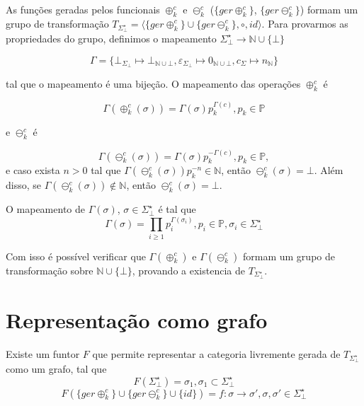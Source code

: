 \documentclass[a4paper]{article}
\newcommand{\baseset}{{\Sigma^\star_\bot}}
\newcommand{\opa}{{\oplus^c_k}}
\newcommand{\gopa}{{\{ger\opa\}}}
\newcommand{\opb}{{\ominus^c_k}}
\newcommand{\gopb}{{\{ger\opb\}}}
\newcommand{\transMon}{{T_\baseset}}
\newcommand{\composition}{{\circ}}
\newcommand{\morun}{{\gopa \cup \gopb \cup \{id\}}}
\begin{document}
As funções geradas pelos funcionais $\opa$ e $\opb$ ($\gopa$, $\gopb$) formam um grupo de transformação $\transMon = \langle\gopa \cup \gopb, \composition, id\rangle$. Para provarmos as propriedades do grupo, definimos o mapeamento $\baseset \to \mathbb{N} \cup \{\bot\}$

\begin{equation} \label{map:set}
\Gamma = \{ \bot_{\Sigma_\bot} \mapsto \bot_{\mathbb{N}\cup \bot}, \varepsilon_{\Sigma_\bot} \mapsto 0_{\mathbb{N}\cup \bot}, c_{\Sigma} \mapsto n_{\mathbb{N}}\}
\end{equation}

tal que o mapeamento é uma bijeção. O mapeamento das operações $\opa$ é

\begin{equation} \label{map:opa}
\Gamma(\opa(\sigma)) = \Gamma(\sigma) p_k^{\Gamma(c)}, p_k \in \mathbb{P}
\end{equation}

e $\opb$ é

\begin{equation} \label{map:opb}
\Gamma(\opb(\sigma)) = \Gamma(\sigma) p_k^{-\Gamma(c)}, p_k \in \mathbb{P},
\end{equation}
e caso exista $n > 0$ tal que $\Gamma(\opb(\sigma)) p_k^{-n} \in \mathbb{N}$, então $\opb(\sigma) = \bot$. Além disso, se $\Gamma(\opb(\sigma)) \notin \mathbb{N}$, então $\opb(\sigma) = \bot$. 

O mapeamento de $\Gamma(\sigma)$, $\sigma \in \baseset$ é tal que
\begin{equation} \label{map:sigma}
\Gamma(\sigma) = \prod_{i \ge 1} p_i^{\Gamma(\sigma_i)}, p_i \in \mathbb{P}, \sigma_i \in \baseset
\end{equation}

Com isso é possível verificar que $\Gamma(\opa)$ e $\Gamma(\opb)$ formam um grupo de transformação sobre $\mathbb{N} \cup \{\bot\}$, provando a existencia de $\transMon$.


\section*{Representação como grafo}
Existe um funtor $F$ que permite representar a categoria livremente gerada de $\transMon$ como um grafo, tal que
\begin{equation} \label{fun:set}
F(\baseset) = \sigma_1, \sigma_1 \subset \baseset
\end{equation}
\begin{equation} \label{fun:mor}
F(\morun) = f:\sigma \to \sigma\prime, \sigma,\sigma\prime \in \baseset
\end{equation}
\end{document}
